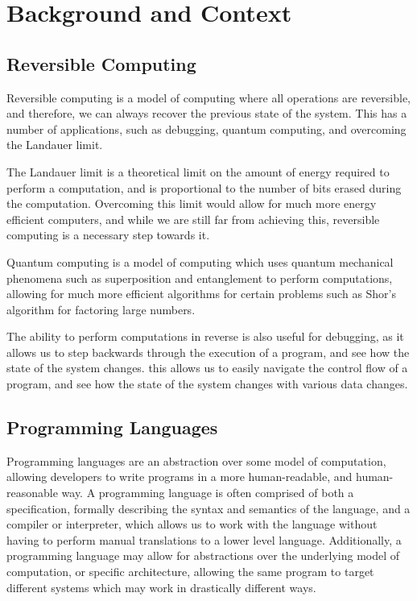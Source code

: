 \section*{Background and Context}

\subsection*{Reversible Computing}\label{subsec:rev-comp}
Reversible computing is a model of computing where all operations are reversible, and therefore, we can always recover the previous state of the system.
This has a number of applications, such as debugging, quantum computing, and overcoming the Landauer limit.

The Landauer limit is a theoretical limit on the amount of energy required to perform a computation, and is proportional to the number of bits erased during the computation.
Overcoming this limit would allow for much more energy efficient computers, and while we are still far from achieving this, reversible computing is a necessary step towards it.

Quantum computing is a model of computing which uses quantum mechanical phenomena such as superposition and entanglement to perform computations, allowing for much more efficient algorithms for certain problems such as Shor's algorithm for factoring large numbers.

The ability to perform computations in reverse is also useful for debugging, as it allows us to step backwards through the execution of a program, and see how the state of the system changes.
this allows us to easily navigate the control flow of a program, and see how the state of the system changes with various data changes.

\subsection*{Programming Languages}\label{subsec:pl}
Programming languages are an abstraction over some model of computation, allowing developers to write programs in a more human-readable, and human-reasonable way.
A programming language is often comprised of both a specification, formally describing the syntax and semantics of the language, and a compiler or interpreter, which allows us to work with the language without having to perform manual translations to a lower level language.
Additionally, a programming language may allow for abstractions over the underlying model of computation, or specific architecture, allowing the same program to target different systems which may work in drastically different ways.

